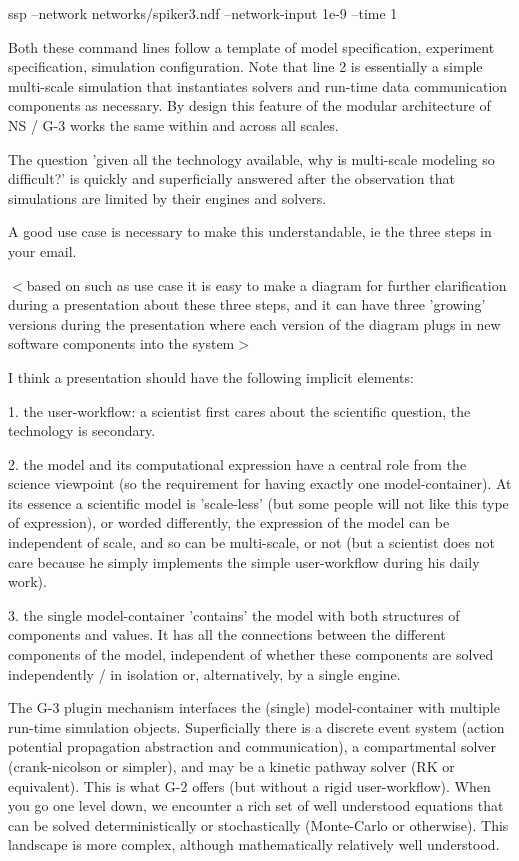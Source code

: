 \documentclass[12pt]{article}
\begin{document}
ssp --network networks/spiker3.ndf --network-input 1e-9 --time 1

Both these command lines follow a template of model specification,
experiment specification, simulation configuration.  Note that line 2
is essentially a simple multi-scale simulation that instantiates
solvers and run-time data communication components as necessary.  By
design this feature of the modular architecture of NS / G-3 works the
same within and across all scales.

The question 'given all the technology available, why is multi-scale
modeling so difficult?' is quickly and superficially answered after
the observation that simulations are limited by their engines and
solvers.

A good use case is necessary to make this understandable, ie the three
steps in your email.

$<$based on such as use case it is easy to make a diagram for further
clarification during a presentation about these three steps, and it
can have three 'growing' versions during the presentation where each
version of the diagram plugs in new software components into the
system$>$

I think a presentation should have the following implicit elements:

1. the user-workflow: a scientist first cares about the scientific
question, the technology is secondary.

2. the model and its computational expression have a central role from
the science viewpoint (so the requirement for having exactly one
model-container).  At its essence a scientific model is 'scale-less'
(but some people will not like this type of expression), or worded
differently, the expression of the model can be independent of scale,
and so can be multi-scale, or not (but a scientist does not care
because he simply implements the simple user-workflow during his daily
work).

3. the single model-container 'contains' the model with both
structures of components and values.  It has all the connections
between the different components of the model, independent of whether
these components are solved independently / in isolation or,
alternatively, by a single engine.

The G-3 plugin mechanism interfaces the (single) model-container with
multiple run-time simulation objects.  Superficially there is a
discrete event system (action potential propagation abstraction and
communication), a compartmental solver (crank-nicolson or simpler),
and may be a kinetic pathway solver (RK or equivalent).  This is what
G-2 offers (but without a rigid user-workflow).  When you go one level
down, we encounter a rich set of well understood equations that can be
solved deterministically or stochastically (Monte-Carlo or otherwise).
 This landscape is more complex, although mathematically relatively
well understood.
\end{document}
